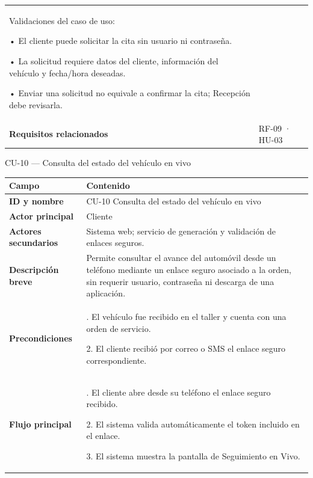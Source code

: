 {\begin{longtable}[]{@{}
  >{\raggedright\arraybackslash}p{}
  >{\raggedright\arraybackslash}p{}@{}}
Validaciones del caso de uso:

• El cliente puede solicitar la cita sin usuario ni contraseña.

• La solicitud requiere datos del cliente, información del vehículo y
fecha/hora deseadas.

• Enviar una solicitud no equivale a confirmar la cita; Recepción debe
revisarla. \\
\textbf{Requisitos relacionados} & RF-09 · HU-03 \\
\end{longtable}
}

CU-10 --- Consulta del estado del vehículo en vivo

{\def\LTcaptype{none} %
\begin{longtable}[]{@{}
  >{\raggedright\arraybackslash}p{}
  >{\raggedright\arraybackslash}p{}@{}}
\toprule\noalign{}
\begin{minipage}[b]{\linewidth}\raggedright
\textbf{Campo}
\end{minipage} & \begin{minipage}[b]{\linewidth}\raggedright
\textbf{Contenido}
\end{minipage} \\
\midrule\noalign{}
\endhead
\bottomrule\noalign{}
\endlastfoot
\textbf{ID y nombre} & CU-10 Consulta del estado del vehículo en vivo \\
\textbf{Actor principal} & Cliente \\
\textbf{Actores secundarios} & Sistema web; servicio de generación y
validación de enlaces seguros. \\
\textbf{Descripción breve} & Permite consultar el avance del automóvil
desde un teléfono mediante un enlace seguro asociado a la orden, sin
requerir usuario, contraseña ni descarga de una aplicación. \\
\textbf{Precondiciones} & 1. El vehículo fue recibido en el taller y
cuenta con una orden de servicio.

2. El cliente recibió por correo o SMS el enlace seguro
correspondiente. \\
\textbf{Flujo principal} & 1. El cliente abre desde su teléfono el
enlace seguro recibido.

2. El sistema valida automáticamente el token incluido en el enlace.

3. El sistema muestra la pantalla de Seguimiento en Vivo.


\end{longtable}}
